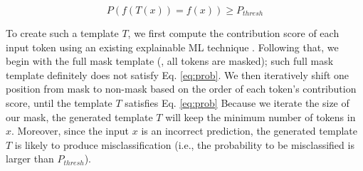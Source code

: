 \begin{equation}
    P(f(T(x)) = f(x)) \ge P_{thresh}
    \label{eq:prob}
\end{equation}


To create such a template $T$, we first compute the contribution score
of each input token using an existing explainable ML technique
\cite{}. Following that, we begin with the full mask template (\ie,
all tokens are masked); such full mask template definitely does not
satisfy Eq. \ref{eq:prob}.  We then iteratively shift one position
from mask to non-mask based on the order of each token's contribution
score, until the template $T$ satisfies Eq. \ref{eq:prob} Because we
iterate the size of our mask, the generated template $T$ will keep the
minimum number of tokens in $x$. Moreover, since the input $x$ is an
incorrect prediction, the generated template $T$ is likely to produce
misclassification (i.e., the probability to be misclassified is larger
than $P_{thresh}$).



% 











%








